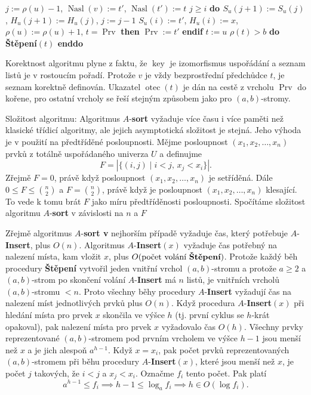 \documentclass[a4paper,12pt]{article}
\DeclareMathOperator*{\otec}{otec}
\DeclareMathOperator*{\Prv}{Prv}
\DeclareMathOperator*{\Nasl}{Nasl}
\DeclareMathOperator*{\key}{key}
\begin{document}
\phantom{---------}$j:=\rho (u)-1$, $\Nasl(v):=t'$, $\Nasl(t'):=t$\newline 
\phantom{---------}{\bf while} $j\ge i$ {\bf do\newline 
\phantom{------------}$S_u(j+1):=S_u(j)$}, $H_u(j+1):=H_u(j)$, $j:=j-1$\newline 
\phantom{---------}{\bf enddo}\newline 
\phantom{---------}$S_u(i):=t'$, $H_u(i):=x$, $\rho (u):=\rho (u)+1$,\newline 
\phantom{---------}{\bf if} $t=\Prv$ {\bf then} $\Prv:=t'$ {\bf endif}\newline 
\phantom{------}{\bf endif}\newline 
\phantom{------}$t:=u$\newline 
\phantom{------}{\bf while} $\rho (t)>b$ {\bf do Štěpení$(t)$ enddo}\newline 
\phantom{---}{\bf endif\newline 
endif}

Korektnost algoritmu plyne z faktu, že $\key$ je 
izomorfismus uspo\-řá\-dání a seznam listů je v 
rostoucím pořadí. Protože $v$ je vždy bez\-prost\-řední 
předchůdce $t$, je seznam korektně definován. 
U\-ka\-zatel $\otec(t)$ je dán na cestě z vrcholu $\Prv$ do 
kořene, pro ostatní vrcholy se řeší stejným 
způsobem jako pro $(a,b)$-stromy.

Složitost algoritmu: Algoritmus $A$-{\bf sort} vyžaduje více 
času i více paměti než klasické třídicí algoritmy, ale jejich 
asymptotická složitost je stejná. Jeho výhoda je v použití 
na před\-tří\-děné posloupnosti. Mějme posloupnost $
(x_1,x_2,\dots,x_n)$ 
prvků z to\-tálně uspořádaného univerza $U$ a definujme 
$$F=|\{(i,j)\mid i<j,\,x_j<x_i\}|.$$
Zřejmě $F=0$, právě když posloupnost 
$(x_1,x_2,\dots,x_n)$ je setří\-děná. Dále $0\le F\le\binom 
n2$ a $F=\binom n2$, právě 
když je posloupnost $(x_1,x_2,\dots,x_n)$ klesající. To vede k tomu 
brát $F$ jako míru předtříděnosti posloupnosti. Spočítáme 
složitost algoritmu $A$-{\bf sort} v závislosti na $n$ a $F$

Zřejmě algoritmus $A$-{\bf sort v} nejhorším případě vyžaduje čas, 
který potřebuje $A$-{\bf Insert}, plus $O(n)$.  Algoritmus $
A$-{\bf Insert$(x)$ }
vyžaduje čas potřebný na nalezení místa, kam vložit $
x$, plus 
$O(\text{\rm počet volání {\bf Štěpení}})$.  Protože každý běh procedury 
{\bf Ště\-pení} vytvořil jeden vnitřní vrchol $
(a,b)$-stromu a protože $a\ge 2$ 
a $(a,b)$-strom po skončení volání $A$-{\bf Insert} má $
n$ listů, 
je vnitřních vrcholů $(a,b)$-stromu $<n$.  Proto všechny 
běhy procedury $A$-{\bf Insert} vyžadují čas na nalezení míst 
jednotlivých prvků plus $O(n)$.  Když procedura 
$A$-{\bf Insert$(x)$} při hledání místa pro prvek $x$ skončila ve výšce $
h$ 
(tj.  první cyklus se $h$-krát opakoval), pak nalezení místa pro 
prvek $x$ vyžadovalo čas $O(h)$.  Všechny prvky reprezentované 
$(a,b)$-stromem pod prvním vrcholem ve výšce $h-1$ jsou menší 
než $x$ a je jich alespoň $a^{h-1}$.  Když $x=x_i$, pak počet 
prvků reprezentovaných $(a,b)$-stromem při běhu 
procedury $A$-{\bf Insert$(x)$}, které jsou menší než $
x$, je počet $j$ takových, že $i<j$ a $x_j<x_i$.
Označme $f_i$ tento počet. Pak platí 
$$a^{h-1}\le f_i\implies h-1\le\log_af_i\implies h\in O(\log f_i).$$
\end{document}
